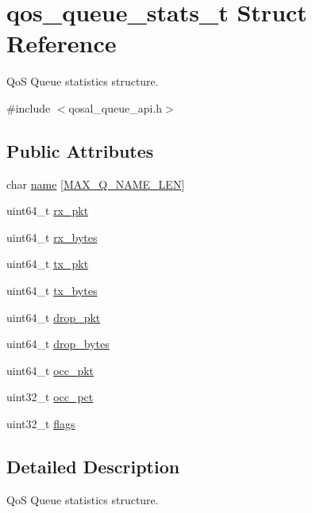 \hypertarget{structqos__queue__stats__t}{\section{qos\-\_\-queue\-\_\-stats\-\_\-t Struct Reference}
\label{structqos__queue__stats__t}
}


Qo\-S Queue statistics structure.  




{\ttfamily \#include $<$qosal\-\_\-queue\-\_\-api.\-h$>$}

\subsection*{Public Attributes}
\begin{DoxyCompactItemize}
\item 
char \hyperlink{structqos__queue__stats__t_a86a3a95e8e4a3bfaa4a18adf7e0e774b}{name} \mbox{[}\hyperlink{group__FAPI__QOS__QUEUE_ga8c2658456d4f94c43de2b47e6cc488eb}{M\-A\-X\-\_\-\-Q\-\_\-\-N\-A\-M\-E\-\_\-\-L\-E\-N}\mbox{]}
\item 
uint64\-\_\-t \hyperlink{structqos__queue__stats__t_a5aaa1719313d242fbf106e09efd46d6c}{rx\-\_\-pkt}
\item 
uint64\-\_\-t \hyperlink{structqos__queue__stats__t_a2a9787515b36cbc95cccb17ac22fd2eb}{rx\-\_\-bytes}
\item 
uint64\-\_\-t \hyperlink{structqos__queue__stats__t_a121b80595d3faab041d2aebb2fbc1e72}{tx\-\_\-pkt}
\item 
uint64\-\_\-t \hyperlink{structqos__queue__stats__t_a358b6a71b2faee13c4b52bfd86633aae}{tx\-\_\-bytes}
\item 
uint64\-\_\-t \hyperlink{structqos__queue__stats__t_a68c4ac994cb234e4d12b8d41c726b5be}{drop\-\_\-pkt}
\item 
uint64\-\_\-t \hyperlink{structqos__queue__stats__t_a86e9a12c3218b8a91d62a3da95b2daf8}{drop\-\_\-bytes}
\item 
uint64\-\_\-t \hyperlink{structqos__queue__stats__t_acda55406419650adc37794fe31f493b8}{occ\-\_\-pkt}
\item 
uint32\-\_\-t \hyperlink{structqos__queue__stats__t_afd0bb346239a46de8f7803b7d7bf7ec7}{occ\-\_\-pct}
\item 
uint32\-\_\-t \hyperlink{structqos__queue__stats__t_a151f189f991fa0564835e9e5c37bde29}{flags}
\end{DoxyCompactItemize}


\subsection{Detailed Description}
Qo\-S Queue statistics structure. 

